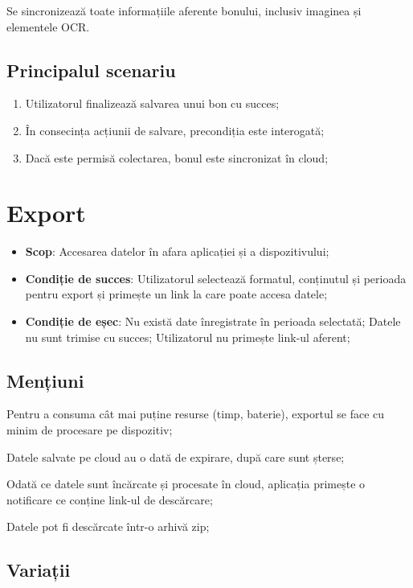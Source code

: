 Se sincronizează toate informațiile aferente bonului, inclusiv imaginea și elementele OCR.

\subsection{Principalul scenariu}\label{principalul-scenariu-3}

\begin{enumerate}
\item
  Utilizatorul finalizează salvarea unui bon cu succes;
\item
  În consecința acțiunii de salvare, precondiția este interogată;
\item
  Dacă este permisă colectarea, bonul este sincronizat în cloud;
\end{enumerate}

\section{Export}\label{export}

\begin{itemize}
\item
  \textbf{Scop}: Accesarea datelor în afara aplicației și a dispozitivului;
\item
  \textbf{Condiție de succes}: Utilizatorul selectează formatul, conținutul și perioada pentru export și primește un link la care poate accesa datele;
\item
  \textbf{Condiție de eșec}: Nu există date înregistrate în perioada selectată; Datele nu sunt trimise cu succes; Utilizatorul nu primește link-ul aferent;
\end{itemize}

\subsection{Mențiuni}\label{menux21biuni-3}

Pentru a consuma cât mai puține resurse (timp, baterie), exportul se face cu minim de procesare pe dispozitiv;

Datele salvate pe cloud au o dată de expirare, după care sunt șterse;

Odată ce datele sunt încărcate și procesate în cloud, aplicația primește o notificare ce conține link-ul de descărcare;

Datele pot fi descărcate într-o arhivă zip;

\subsection{Variații}\label{variaux21bii-2}


